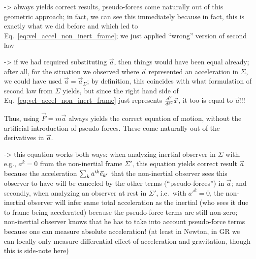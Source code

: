 \documentclass[../class_mech_main.tex]{subfiles}
\begin{document}
-> always yields correct results, pseudo-forces come naturally out of this geometric approach; in fact, we can see this immediately because in fact, this is exactly what we did before and which led to Eq.~\eqref{eq:vel_accel_non_inert_frame}; we just applied \enquote{wrong} version of second law

-> if we had required substituting $\vec{a}$, then things would have been equal already; after all, for the situation we observed where $\vec{a}$ represented an acceleration in $\Sigma$, we could have used $\vec{a} = \vec{a}_\Sigma$; by definition, this coincides with what formulation of second law from $\Sigma$ yields, but since the right hand side of Eq.~\eqref{eq:vel_accel_non_inert_frame} just represents $\dv[2]{t} \vec{x}$, it too is equal to $\vec{a}$!!!

Thus, using $\vec{F} = m \vec{a}$ always yields the correct equation of motion, without the artificial introduction of pseudo-forces. These come naturally out of the derivatives in $\vec{a}$.



-> this equation works both ways: when analyzing inertial observer in $\Sigma$ with, e.g., $a^k = 0$ from the non-inertial frame $\Sigma'$, this equation yields correct result $\vec{a}$ because the acceleration $\sum_k a'^k \vec{e}_{k'}$ that the non-inertial observer sees this observer to have will be canceled by the other terms (\enquote{pseudo-forces}) in $\vec{a}$; and secondly, when analyzing an observer at rest in $\Sigma'$, i.e.~with $a'^k = 0$, the non-inertial observer will infer same total acceleration as the inertial (who sees it due to frame being accelerated) because the pseudo-force terms are still non-zero; non-inertial observer knows that he has to take into account pseudo-force terms because one can measure absolute acceleration! (at least in Newton, in GR we can locally only measure differential effect of acceleration and gravitation, though this is side-note here)


\end{document}
